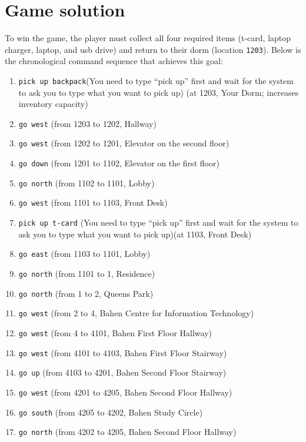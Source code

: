 \documentclass[11pt]{article}
\begin{document}
\section*{Game solution}
To win the game, the player must collect all four required items (t-card, laptop charger, laptop, and usb drive) and return to their dorm (location \texttt{1203}). Below is the chronological command sequence that achieves this goal:

\begin{enumerate}
    \item \texttt{pick up backpack}\quad (You need to type “pick up” first and wait for the system to ask you to type what you want to pick up)
    \quad (at 1203, Your Dorm; increases inventory capacity)
    \item \texttt{go west} \quad (from 1203 to 1202, Hallway)
    \item \texttt{go west} \quad (from 1202 to 1201, Elevator on the second floor)
    \item \texttt{go down} \quad (from 1201 to 1102, Elevator on the first floor)
    \item \texttt{go north} \quad (from 1102 to 1101, Lobby)
    \item \texttt{go west} \quad (from 1101 to 1103, Front Desk)
    \item \texttt{pick up t-card} \quad (You need to type “pick up” first and wait for the system to ask you to type what you want to pick up)\quad (at 1103, Front Desk)
    \item \texttt{go east} \quad (from 1103 to 1101, Lobby)
    \item \texttt{go north} \quad (from 1101 to 1, Residence)
    \item \texttt{go north} \quad (from 1 to 2, Queens Park)
    \item \texttt{go west} \quad (from 2 to 4, Bahen Centre for Information Technology)
    \item \texttt{go west} \quad (from 4 to 4101, Bahen First Floor Hallway)
    \item \texttt{go west} \quad (from 4101 to 4103, Bahen First Floor Stairway)
    \item \texttt{go up} \quad (from 4103 to 4201, Bahen Second Floor Stairway)
    \item \texttt{go west} \quad (from 4201 to 4205, Bahen Second Floor Hallway)
    \item \texttt{go south} \quad (from 4205 to 4202, Bahen Study Circle)
    \item \texttt{go north} \quad (from 4202 to 4205, Bahen Second Floor Hallway)

\end{enumerate}
\end{document}
